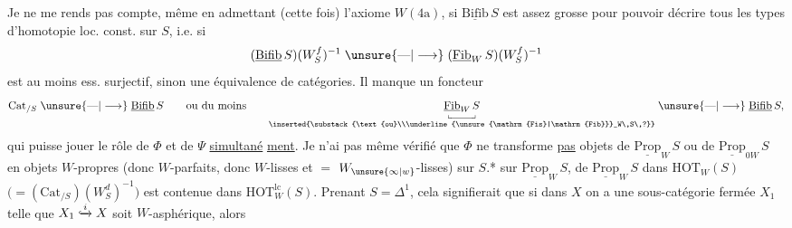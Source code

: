Je ne me rends pas compte,  même en
admettant (cette fois) l'axiome $W(4\mathrm a)$, si
$\underline{\mathrm{Bifib}}\,S$ est assez grosse pour pouvoir décrire tous
les types d'homotopie  loc. const. sur $S$, i.e. si
\[
(\underline{\mathrm{Bifib}}\,S)(W_S^f)^{-1}\mathrel{\unsure{\text{---}|\longrightarrow}}
(\underline{\mathrm{Fib}}_W\,S)(W_S^f)^{-1}
\]
est au moins ess. surjectif, sinon une équivalence de
catégories. Il manque un foncteur
\[
\mathrm{Cat}_{/S}\mathrel{\unsure{\text{---}|\longrightarrow}}\underline{\mathrm{Bifib}}\,S
\qquad\text{ou du moins}\qquad
\underset{\inserted{\substack{\text{ou}\\\underline{\unsure{\mathrm{Fis}|\mathrm{Fib}}}_W\,S\,?}}}{\underset{\llcorner\!\rule{2em}{.35pt}\!\lrcorner}{\underline{\mathrm{Fib}}_W\,S}}
\mathrel{\unsure{\text{---}|\longrightarrow}}\underline{\mathrm{Bifib}}\,S,
\]
qui  puisse jouer le rôle de $\Phi$ et de $\Psi$ \uline{simultané}%
%
%
\uline{ment}. Je n'ai pas même vérifié que $\Phi$ ne transforme \uline{pas}  objets de $\underline{\mathrm{Prop}}_W\,S$ ou de $\underline{\mathrm{Prop}}_{0W}\,S$ en
objets $W$-propres (donc $W$-parfaits, donc 
$W$-lisses et $=$ $W_{\unsure{\infty|w}}$-lisses) sur $S$.*
  sur $\underline{\mathrm{Prop}}_W\,S$,  
de $\underline{\mathrm{Prop}}_W\,S$ dans $\mathrm{HOT}_W(S)$
$\bigl(=(\mathrm{Cat}_{/S})(W_S^d)^{-1}\bigr)$ est contenue dans $\mathrm{HOT}_W^{\mathrm{lc}}(S)$.
Prenant $S=\Delta^1$, cela signifierait que si dans $X$
on a une sous-catégorie fermée $X_1$ telle que
$X_1\lhook\joinrel\xrightarrow{i}X$ soit $W$-asphérique, alors
